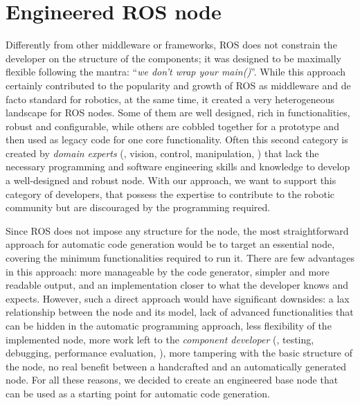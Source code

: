 \section{Engineered ROS node}
\label{sec:ros-node}
Differently from other middleware or frameworks, ROS does not constrain the developer on the structure of the components; it was designed to be maximally flexible following the mantra: ``\textit{we don't wrap your main()}''. While this approach certainly contributed to the popularity and growth of ROS as middleware and de facto standard for robotics, at the same time, it created a very heterogeneous landscape for ROS nodes. Some of them are well designed, rich in functionalities, robust and configurable, while others are cobbled together for a prototype and then used as legacy code for one core functionality. Often this second category is created by \textit{domain experts} (\eg, vision, control, manipulation, \etc) that lack the necessary programming and software engineering skills and knowledge to develop a well-designed and robust node. With our approach, we want to support this category of developers, that possess the expertise to contribute to the robotic community but are discouraged by the programming required.

Since ROS does not impose any structure for the node, the most straightforward approach for automatic code generation would be to target an essential node, covering the minimum functionalities required to run it. There are few advantages in this approach: more manageable by the code generator, simpler and more readable output, and an implementation closer to what the developer knows and expects. However, such a direct approach would have significant downsides: a lax relationship between the node and its model, lack of advanced functionalities that can be hidden in the automatic programming approach, less flexibility of the implemented node, more work left to the \textit{component developer} (\eg, testing, debugging, performance evaluation, \etc), more tampering with the basic structure of the node, no real benefit between a handcrafted and an automatically generated node. For all these reasons, we decided to create an engineered base node that can be used as a starting point for automatic code generation.

